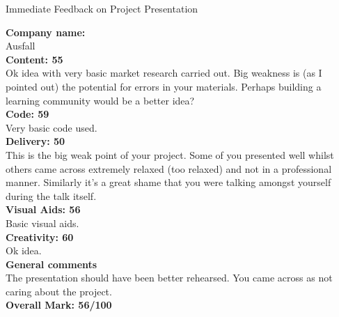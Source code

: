 \documentclass{article}
\begin{document}
\begin{center}
\Huge{Immediate Feedback on Project Presentation}\\
\end{center}


\normalsize
\textbf{Company name:}\\

Ausfall\\

\textbf{Content: 55}\\

Ok idea with very basic market research carried out.
Big weakness is (as I pointed out) the potential for errors in your materials.
Perhaps building a learning community would be a better idea?\\

\textbf{Code: 59}\\

Very basic code used.\\

\textbf{Delivery: 50}\\

This is the big weak point of your project.
Some of you presented well whilst others came across extremely relaxed (too relaxed) and not in a professional manner.
Similarly it's a great shame that you were talking amongst yourself during the talk itself.\\

\textbf{Visual Aids: 56}\\

Basic visual aids.\\

\textbf{Creativity: 60}\\

Ok idea.\\

\textbf{General comments}\\

The presentation should have been better rehearsed.
You came across as not caring about the project.\\

\textbf{Overall Mark: 56/100}
\end{document}
